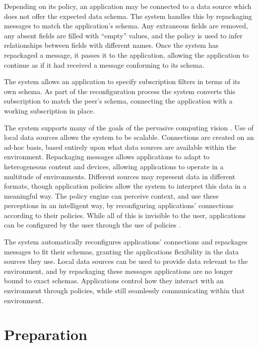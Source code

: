 \documentclass[12pt,twoside,notitlepage]{report}
\begin{document}
Depending on its policy, an application may be connected to a data source which does not offer the expected data schema. 
The system handles this by repackaging messages to match the application's schema. Any extraneous fields are removed, any absent fields are filled with ``empty'' values, and the policy is used to infer relationships between fields with different names. 
Once the system has repackaged a message, it passes it to the application, allowing the application to continue as if it had received a message conforming to its schema.

The system allows an application to specify subscription filters in terms of its own schema. 
As part of the reconfiguration process the system converts this subscription to match the peer's schema, connecting the application with a working subscription in place.

The system supports many of the goals of the pervasive computing vision \cite{weiser1991computer}.
Use of local data sources allows the system to be scalable. 
Connections are created on an ad-hoc basis, based entirely upon what data sources are available within the environment. 
Repackaging messages allows applications to adapt to heterogeneous content and devices, allowing applications to operate in a multitude of environments. 
Different sources may represent data in different formats, though application policies allow the system to interpret this data in a meaningful way. 
The policy engine can perceive context, and use these perceptions in an intelligent way, by reconfiguring applications' connections according to their policies. 
While all of this is invisible to the user, applications can be configured by the user through the use of policies \cite{saha2003pervasive}.

The system automatically reconfigures applications' connections and repackages messages to fit their schemas, granting the applications flexibility in the data sources they use.
Local data sources can be used to provide data relevant to the environment, and by repackaging these messages applications are no longer bound to exact schemas. 
Applications control how they interact with an environment through policies, while still seamlessly communicating within that environment.

\cleardoublepage

 
\chapter{Preparation}
\end{document}
